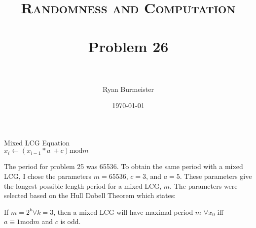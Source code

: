 \documentclass[fontsize=12pt]{article}
\title{ 
  \normalfont \normalsize 
  \textsc{Randomness and Computation} \\ [25pt] %
  \horrule{0.5pt} \\[0.4cm] %
  \huge Problem 26 \\ %
  \horrule{2pt} \\[0.5cm] %
}
\author{Ryan Burmeister} %
\date{\normalsize\today} %
\numberwithin{equation}{section} %
\numberwithin{figure}{section} %
\numberwithin{table}{section} %
\begin{document}
\maketitle %

\begin{center}
Mixed LCG Equation \\
$x_i \leftarrow (x_{i-1}*a\ +c)\text{mod} m$
\end{center}

The period for problem 25 was 65536.  To obtain the same period with
a mixed LCG, I chose the parameters $m=65536$, $c=3$, and $a=5$.  These
parameters give the longest possible length period for a mixed LCG, $m$.
The parameters were selected based on the Hull Dobell Theorem which states:
\begin{center}
If $m=2^k \forall k=3$, then a mixed LCG will have maximal period $m$
$\forall x_0$ iff $a \equiv 1 \text{mod} m$ and $c$ is odd.
\end{center}
\end{document}
